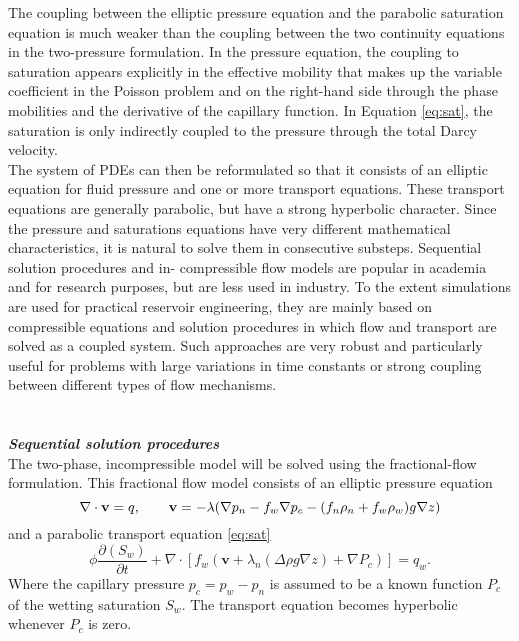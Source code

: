\documentclass[12pt]{article}
\begin{document}
The coupling between the elliptic pressure equation and the parabolic saturation equation is much weaker than the coupling between the two continuity
equations in the two-pressure formulation. In the pressure equation,
the coupling to saturation appears explicitly in the effective mobility that makes up the variable coefficient in the Poisson problem and on the
right-hand side through the phase mobilities and the derivative of the capillary function. In Equation \eqref{eq:sat}, the saturation is only indirectly
coupled to the pressure through the total Darcy velocity. \\
The system of PDEs can then be reformulated so that
it consists of an elliptic equation for fluid pressure and one or more transport equations. These transport equations are generally parabolic, but have a
strong hyperbolic character. Since the pressure and saturations equations have very different mathematical characteristics, it is natural
to solve them in consecutive substeps. Sequential solution procedures and in-
compressible flow models are popular in academia and for research purposes,
but are less used in industry. To the extent simulations are used for practical reservoir engineering, they are mainly based on compressible equations
and solution procedures in which flow and transport are solved as a coupled
system. Such approaches are very robust and particularly useful for problems
with large variations in time constants or strong coupling between different
types of flow mechanisms. \\\\\\
\emph{\textbf{Sequential solution procedures}}\\
The two-phase, incompressible model will be solved using the fractional-flow formulation. This fractional flow model consists of an elliptic
pressure equation
\begin{equation}\label{eq:wdarcy}
 \nabla \cdot \mathbf{v}=q, \qquad \mathbf{v}=-\lambda(\nabla p_n-f_w\nabla p_c-(f_n \rho_n+f_w\rho_w)g\nabla z)\\
\end{equation}
and a parabolic transport equation \eqref{eq:sat}
\begin{equation}\label{eq:wsat}
 \phi\frac{\partial( {S}_{w})}{\partial t}+\nabla \cdot [f_w( \mathbf{v}+\lambda_n(\Delta  \rho g\nabla z)+\nabla P_c)]= q_w.
\end{equation}
Where the capillary pressure $p_c = p_w −p_n$ is assumed to be a known function $P_c$ of the wetting saturation $S_w$. The transport equation becomes hyperbolic whenever $P_c$ is zero.\\
\end{document}
